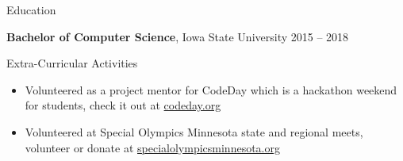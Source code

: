 \documentclass{resume} %
\begin{document}

\begin{rSection}{Education}

{\bf Bachelor of Computer Science}, Iowa State University \hfill {2015 -- 2018}

\end{rSection}

\begin{rSection}{Extra-Curricular Activities}
\begin{itemize}
    \item 	Volunteered as a project mentor for CodeDay which is a hackathon weekend for students, check it out at \href{https://www.codeday.org/}{codeday.org}
    \item Volunteered at Special Olympics Minnesota state and regional meets, volunteer or donate at \href{https://specialolympicsminnesota.org/}{specialolympicsminnesota.org}
\end{itemize}


\end{rSection}

\end{document}

